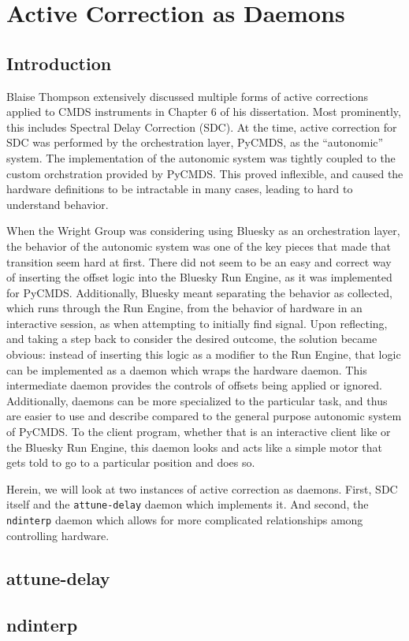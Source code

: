\chapter{Active Correction as Daemons} \label{cha:opa400}

\clearpage

\section{Introduction}  %

Blaise Thompson extensively discussed multiple forms of active corrections applied to CMDS instruments in Chapter 6 of his dissertation\cite{}.
Most prominently, this includes Spectral Delay Correction (SDC).
At the time, active correction for SDC was performed by the orchestration layer, PyCMDS, as the ``autonomic'' system.
The implementation of the autonomic system was tightly coupled to the custom orchstration provided by PyCMDS.
This proved inflexible, and caused the hardware definitions to be intractable in many cases, leading to hard to understand behavior.

When the Wright Group was considering using Bluesky as an orchestration layer, the behavior of the autonomic system was one of the key pieces that made that transition seem hard at first.
There did not seem to be an easy and correct way of inserting the offset logic into the Bluesky Run Engine, as it was implemented for PyCMDS.
Additionally, Bluesky meant separating the behavior as collected, which runs through the Run Engine, from the behavior of hardware in an interactive session, as when attempting to initially find signal.
Upon reflecting, and taking a step back to consider the desired outcome, the solution became obvious: instead of inserting this logic as a modifier to the Run Engine, that logic can be implemented as a daemon which wraps the hardware daemon.
This intermediate daemon provides the controls of offsets being applied or ignored.
Additionally, daemons can be more specialized to the particular task, and thus are easier to use and describe compared to the general purpose autonomic system of PyCMDS.
To the client program, whether that is an interactive client like \yaqcqtpy{} or the Bluesky Run Engine, this daemon looks and acts like a simple motor that gets told to go to a particular position and does so.

Herein, we will look at two instances of active correction as daemons.
First, SDC itself and the \texttt{attune-delay} daemon which implements it.
And second, the \texttt{ndinterp} daemon which allows for more complicated relationships among controlling hardware.

\clearpage

\section{attune-delay}  %

\clearpage

\section{ndinterp}  %

\clearpage
